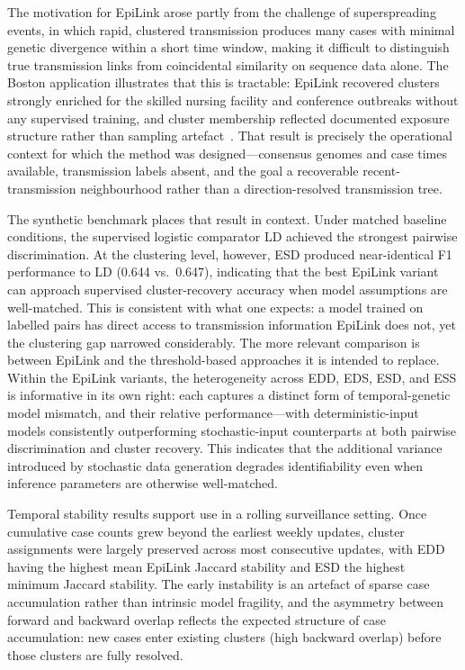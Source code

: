 \documentclass[10pt,letterpaper]{article}
\begin{document}
The motivation for EpiLink arose partly from the challenge of superspreading events, in which rapid, clustered transmission produces many cases with minimal genetic divergence within a short time window, making it difficult to distinguish true transmission links from coincidental similarity on sequence data alone. The Boston application illustrates that this is tractable: EpiLink recovered clusters strongly enriched for the skilled nursing facility and conference outbreaks without any supervised training, and cluster membership reflected documented exposure structure rather than sampling artefact~\cite{Lemieux2021}. That result is precisely the operational context for which the method was designed---consensus genomes and case times available, transmission labels absent, and the goal a recoverable recent-transmission neighbourhood rather than a direction-resolved transmission tree.

The synthetic benchmark places that result in context. Under matched baseline conditions, the supervised logistic comparator LD achieved the strongest pairwise discrimination. At the clustering level, however, ESD produced near-identical F1 performance to LD (0.644 vs.\ 0.647), indicating that the best EpiLink variant can approach supervised cluster-recovery accuracy when model assumptions are well-matched. This is consistent with what one expects: a model trained on labelled pairs has direct access to transmission information EpiLink does not, yet the clustering gap narrowed considerably. The more relevant comparison is between EpiLink and the threshold-based approaches it is intended to replace. Within the EpiLink variants, the heterogeneity across EDD, EDS, ESD, and ESS is informative in its own right: each captures a distinct form of temporal-genetic model mismatch, and their relative performance---with deterministic-input models consistently outperforming stochastic-input counterparts at both pairwise discrimination and cluster recovery. This indicates that the additional variance introduced by stochastic data generation degrades identifiability even when inference parameters are otherwise well-matched.

Temporal stability results support use in a rolling surveillance setting. Once cumulative case counts grew beyond the earliest weekly updates, cluster assignments were largely preserved across most consecutive updates, with EDD having the highest mean EpiLink Jaccard stability and ESD the highest minimum Jaccard stability. The early instability is an artefact of sparse case accumulation rather than intrinsic model fragility, and the asymmetry between forward and backward overlap reflects the expected structure of case accumulation: new cases enter existing clusters (high backward overlap) before those clusters are fully resolved.
\end{document}
